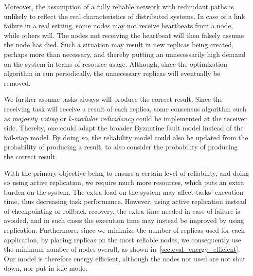 \documentclass{cslthse-msc}
\begin{document}
Moreover, the assumption of a fully reliable network with redundant paths is unlikely to reflect the real characteristics of distributed systems. In case of a link failure in a real setting, some nodes may not receive heartbeats from a node, while others will. The nodes not receiving the heartbeat will then falsely assume the node has died. Such a situation may result in new replicas being created, perhaps more than necessary, and thereby putting an unnecessarily high demand on the system in terms of resource usage. Although, since the optimization algorithm in run periodically, the unnecessary replicas will eventually be removed.

We further assume tasks always will produce the correct result. Since the receiving task will receive a result of each replica, some consensus algorithm such as \emph{majority voting} or \emph{k-modular redundancy} could be implemented at the receiver side. Thereby, one could adapt the broader Byzantine fault model instead of the fail-stop model. By doing so, the reliability model could also be updated from the probability of producing a result, to also consider the probability of producing the correct result.

With the primary objective being to ensure a certain level of reliability, and doing so using active replication, we require much more resources, which puts an extra burden on the system. The extra load on the system may affect tasks' execution time, thus decreasing task performance. However, using active replication instead of checkpointing or rollback recovery, the extra time needed in case of failure is avoided, and in such cases the execution time may instead be improved by using replication. Furthermore, since we minimize the number of replicas used for each application, by placing replicas on the most reliable nodes, we consequently use the minimum number of nodes overall, as shown in~\cref{sec:eval_energy_efficient}. Our model is therefore energy efficient, although the nodes not used are not shut down, nor put in idle mode.
\end{document}
